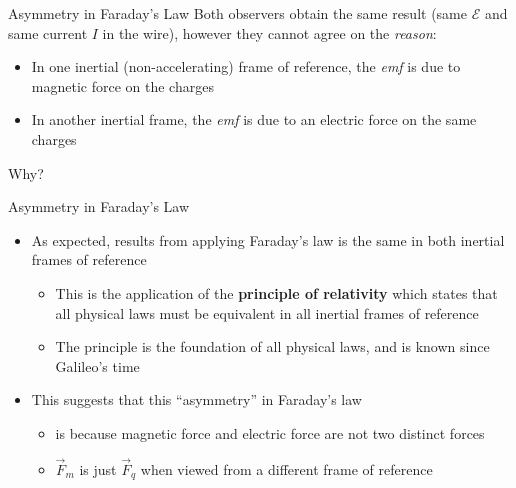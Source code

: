 \documentclass[12pt,aspectratio=169]{beamer}
\begin{document}
\begin{frame}{Asymmetry in Faraday's Law}
  Both observers obtain the same result (same $\mathcal E$ and same current $I$
  in the wire), however they cannot agree on the \emph{reason}:
  \begin{itemize}
  \item In one inertial (non-accelerating) frame of reference, the \emph{emf}
    is due to magnetic force on the charges
  \item In another inertial frame, the \emph{emf} is due to an electric force
    on the same charges
  \end{itemize}
  Why?
\end{frame}


\begin{frame}{Asymmetry in Faraday's Law}
  \begin{itemize}
  \item As expected, results from applying Faraday's law is the same in both
    inertial frames of reference
    \begin{itemize}
    \item This is the application of the \textbf{principle of relativity} which
      states that all physical laws must be equivalent in all inertial frames
      of reference
    \item The principle is the foundation of all physical laws, and is known
      since Galileo's time
    \end{itemize}
  \item This suggests that this ``asymmetry'' in Faraday's law 
    \begin{itemize}
    \item is because magnetic force and electric force are not two distinct
      forces
    \item $\vec F_m$ is just $\vec F_q$ when viewed from a different frame of
      reference
    \end{itemize}
  \end{itemize}
\end{frame}
\end{document}
